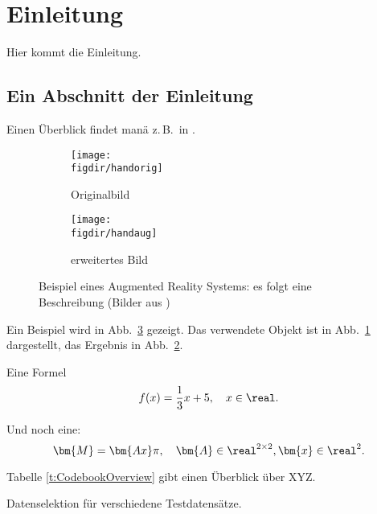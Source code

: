 \section{Einleitung}
\label{s:intro}

Hier kommt die Einleitung.


\subsection{Ein Abschnitt der Einleitung}
\label{ss:intro:abc}

Einen Überblick findet manä z.\,B.\ in \cite{CBM07:intro}.

\begin{figure}[t]
\centering

\begin{subfigure}{0.45\linewidth}
\centering
\texttt{[image: \\figdir/handorig]}
\caption{Originalbild}
\label{FIG:arexorig}
\end{subfigure}
%
\begin{subfigure}{0.45\linewidth}
\centering
\texttt{[image: \\figdir/handaug]}
\caption{erweitertes Bild}
\label{FIG:arexaugm}
\end{subfigure}
%
\caption[AR Beispiel]
{Beispiel eines Augmented Reality Systems: es folgt eine Beschreibung (Bilder aus \cite{Schmidt01:PAO})}
\label{FIG:arex}
\end{figure}

Ein Beispiel wird in Abb.\ \ref{FIG:arex} gezeigt.
Das verwendete Objekt ist in Abb.\ \ref{FIG:arexorig} dargestellt, das Ergebnis in Abb.\ \ref{FIG:arexaugm}.

Eine Formel
\begin{equation}
\label{eq:cvp:test}
f(x) = \frac{1}{3} x + 5, \quad x \in \real.
\end{equation}

Und noch eine:
\begin{equation}
\label{eq:cvp:matvec}
\bm{M}  = \bm{Ax} \pi, \quad \bm{A} \in \real^{2 \times 2}, \bm{x} \in \real^2.
\end{equation}

Tabelle \ref{t:CodebookOverview} gibt einen Überblick über XYZ.

\begin{table}[t]
\centering\small

 \caption[Testtabelle]{Datenselektion für verschiedene Testdatensätze.}
  \label{t:CodebookOverview}
\end{table}




